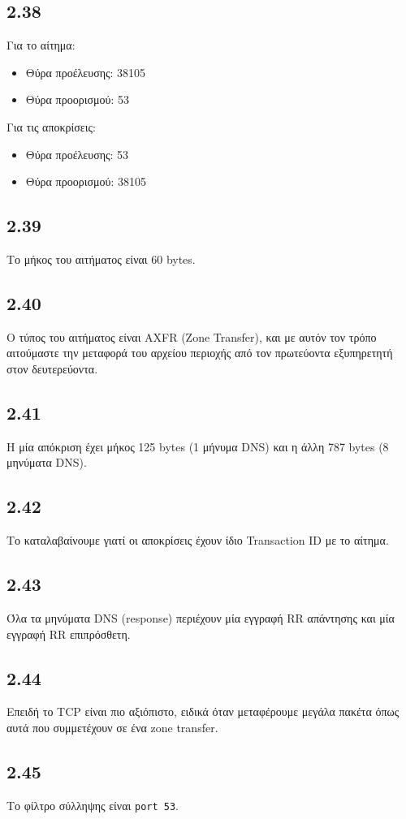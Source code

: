 		\subsection*{2.38} 
			Για το αίτημα:
			
			\begin{itemize}
				\item Θύρα προέλευσης: 38105
				\item Θύρα προορισμού: 53
			\end{itemize}
			
			Για τις αποκρίσεις:
			
			\begin{itemize}
				\item Θύρα προέλευσης: 53
				\item Θύρα προορισμού: 38105
			\end{itemize}

		\subsection*{2.39} 
			Το μήκος του αιτήματος είναι 60 bytes.

		\subsection*{2.40} 
			Ο τύπος του αιτήματος είναι AXFR (Zone Transfer), και με αυτόν τον τρόπο αιτούμαστε την μεταφορά του αρχείου περιοχής από τον πρωτεύοντα εξυπηρετητή στον δευτερεύοντα.

		\subsection*{2.41} 
			Η μία απόκριση έχει μήκος 125 bytes (1 μήνυμα DNS) και η άλλη 787 bytes (8 μηνύματα DNS).

		\subsection*{2.42} 
			Το καταλαβαίνουμε γιατί οι αποκρίσεις έχουν ίδιο Transaction ID με το αίτημα.

		\subsection*{2.43} 
			Όλα τα μηνύματα DNS (response) περιέχουν μία εγγραφή RR απάντησης και μία εγγραφή RR επιπρόσθετη.
			
		\subsection*{2.44}
			 Επειδή το TCP είναι πιο αξιόπιστο, ειδικά όταν μεταφέρουμε μεγάλα πακέτα όπως αυτά που συμμετέχουν σε ένα zone transfer.

		\subsection*{2.45} 
			Το φίλτρο σύλληψης είναι \verb|port 53|.
